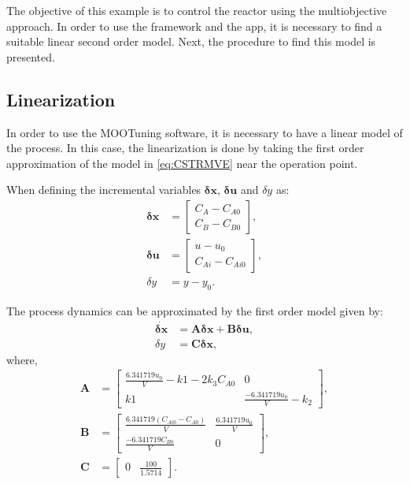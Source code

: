 The objective of this example is to control the reactor using the multiobjective approach. In order to use the framework and the \matlab app, it is necessary to find a suitable linear second order model. Next, the procedure to find this model is presented.

\subsection{Linearization}
\label{sec:CSTRLin}
In order to use the MOOTuning software, it is necessary to have a linear model of the process. In this case, the linearization is done by taking the first order approximation of the model in \eqref{eq:CSTRMVE} near the operation point.

When defining the incremental variables $\mathbf{\delta x}$, $\mathbf{\delta u}$ and $\delta y$ as:
\begin{align*}
\mathbf{\delta x} &= \left[ \begin{array}{c} C_A - C_{A0} \\ C_B - C_{B0} \end{array} \right], \\
\mathbf{\delta u} &= \left[ \begin{array}{c} u-u_0 \\ C_{Ai} - C_{Ai0} \end{array} \right], \\
\delta y &= y - y_0 .
\end{align*}

The process dynamics can be approximated by the first order model given by:
%
\begin{align}
\dot{\mathbf{\delta x}} &=  \mathbf{A}\mathbf{\delta x} + \mathbf{B} \mathbf{\delta u}, \\
%
\delta y &=  \mathbf{C} \mathbf{\delta x},
\end{align}
%
where,
\begin{align*}
	\mathbf{A} &= \left[ \begin{array}{cc} \frac{6.341719 u_0}{V} - k1 - 2 k_3 C_{A0} & 0 \\ k1 & \frac{-6.341719 u_0}{V} - k_2 \end{array}\right],\\
	\mathbf{B} &= \left[ \begin{array}{cc} \frac{6.341719 (C_{Ai0}-C_{A0})}{V} & \frac{6.341719 u_0}{V} \\ \frac{-6.341719 C_{B0}}{V} & 0 \end{array} \right], \\
	\mathbf{C} &= \left[ \begin{array}{cc} 0 & \frac{100}{1.5714} \end{array} \right].
\end{align*}

